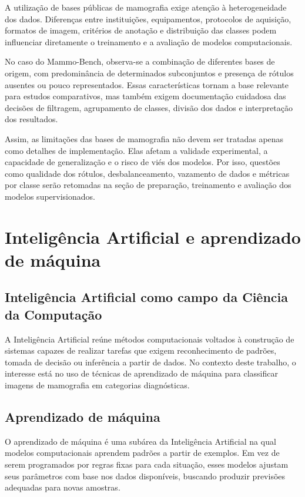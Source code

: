 \documentclass[
    12pt,
    openright,
    oneside,
    a4paper,
    english,
    brazil
]{abntex2}
\begin{document}
A utilização de bases públicas de mamografia exige atenção à heterogeneidade dos dados. Diferenças entre instituições, equipamentos, protocolos de aquisição, formatos de imagem, critérios de anotação e distribuição das classes podem influenciar diretamente o treinamento e a avaliação de modelos computacionais.

No caso do Mammo-Bench, observa-se a combinação de diferentes bases de origem, com predominância de determinados subconjuntos e presença de rótulos ausentes ou pouco representados. Essas características tornam a base relevante para estudos comparativos, mas também exigem documentação cuidadosa das decisões de filtragem, agrupamento de classes, divisão dos dados e interpretação dos resultados.

Assim, as limitações das bases de mamografia não devem ser tratadas apenas como detalhes de implementação. Elas afetam a validade experimental, a capacidade de generalização e o risco de viés dos modelos. Por isso, questões como qualidade dos rótulos, desbalanceamento, vazamento de dados e métricas por classe serão retomadas na seção de preparação, treinamento e avaliação dos modelos supervisionados.
\section{Inteligência Artificial e aprendizado de máquina}

\subsection{Inteligência Artificial como campo da Ciência da Computação}

A Inteligência Artificial reúne métodos computacionais voltados à construção de sistemas capazes de realizar tarefas que exigem reconhecimento de padrões, tomada de decisão ou inferência a partir de dados. No contexto deste trabalho, o interesse está no uso de técnicas de aprendizado de máquina para classificar imagens de mamografia em categorias diagnósticas.

\subsection{Aprendizado de máquina}

O aprendizado de máquina é uma subárea da Inteligência Artificial na qual modelos computacionais aprendem padrões a partir de exemplos. Em vez de serem programados por regras fixas para cada situação, esses modelos ajustam seus parâmetros com base nos dados disponíveis, buscando produzir previsões adequadas para novas amostras.
\end{document}
